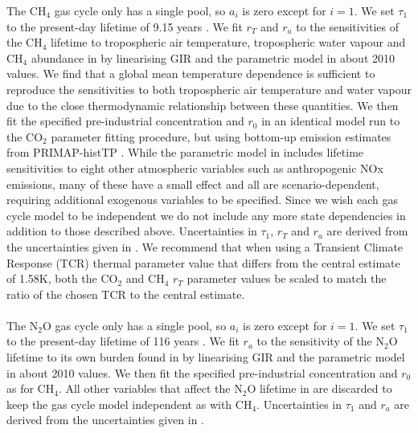 \documentclass[gmd, manuscript]{copernicus}
\begin{document}
The CH$_4$ gas cycle only has a single pool, so $a_i$ is zero except for $i=1$. We set $\tau_1$ to the present-day lifetime of 9.15 years \citep{Holmes2013}. We fit $r_T$ and $r_a$ to the sensitivities of the CH$_4$ lifetime to tropospheric air temperature, tropospheric water vapour and CH$_4$ abundance in \cite{Holmes2013} by linearising GIR and the parametric model in \citeauthor{Holmes2013} about 2010 values. We find that a global mean temperature dependence is sufficient to reproduce the sensitivities to both tropospheric air temperature and water vapour due to the close thermodynamic relationship between these quantities. We then fit the specified pre-industrial concentration and $r_0$ in an identical model run to the CO$_2$ parameter fitting procedure, but using bottom-up emission estimates from PRIMAP-histTP \citep{Gutschow2016}. While the parametric model in \citeauthor{Holmes2013} includes lifetime sensitivities to eight other atmospheric variables such as anthropogenic NOx emissions, many of these have a small effect and all are scenario-dependent, requiring additional exogenous variables to be specified. Since we wish each gas cycle model to be independent we do not include any more state dependencies in addition to those described above. Uncertainties in $\tau_1$, $r_T$ and $r_a$ are derived from the uncertainties given in \cite{Holmes2013}. We recommend that when using a Transient Climate Response (TCR) thermal parameter value that differs from the central estimate of 1.58K, both the CO$_2$ and CH$_4$ $r_T$ parameter values be scaled to match the ratio of the chosen TCR to the central estimate.\\\\
The N$_2$O gas cycle only has a single pool, so $a_i$ is zero except for $i=1$. We set $\tau_1$ to the present-day lifetime of 116 years \citep{Prather2015}. We fit $r_a$ to the sensitivity of the N$_2$O lifetime to its own burden found in \cite{Prather2015} by linearising GIR and the parametric model in \citeauthor{Prather2015} about 2010 values. We then fit the specified pre-industrial concentration and $r_0$ as for CH$_4$. All other variables that affect the N$_2$O lifetime in \citeauthor{Prather2015} are discarded to keep the gas cycle model independent as with CH$_4$. Uncertainties in $\tau_1$ and $r_a$ are derived from the uncertainties given in \cite{Prather2015}.\\\\
\end{document}
